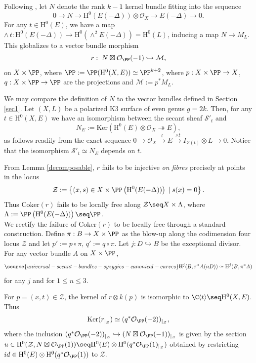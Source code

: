 Following \cite[pg.\ 1177]{V2}, let $N$ denote the rank $k-1$ kernel bundle fitting into the sequence
$$0 \to N \to \mathrm{H}^0(E(-\Delta))\otimes \mathcal{O}_X \to E(-\Delta) \to 0.$$
For any $t \in \mathrm{H}^0(E)$, we have a map $\wedge \, t :\mathrm{H}^0(E(-\Delta)) \to \mathrm{H}^0(\wedge^2 E (-\Delta))=\mathrm{H}^0(L)$, inducing a map $N \to M_L$. This globalizes to a vector bundle morphism
$$r: \; N  \boxtimes \mathcal{O}_{\PP}(-1) \hookrightarrow \mathcal{M} ,$$
on $X \times \PP$, where $\PP:=\PP(\mathrm{H}^0(X,E)) \simeq \PP^{k+2}$, where $p: X \times \PP \to X$, $q: X \times \PP \to \PP$ are the projections and $\mathcal{M}:=p^*M_L$.
\begin{remark}
\notready
We may compare the definition of $N$ to the vector bundles defined in Section \ref{sec1}. Let $(X,L)$ be a polarized K3 surface of even genus $g=2k$. Then, for any $t \in \mathrm{H}^0(X,E)$ we have an isomorphism between the secant sheaf $\mathcal{S}'_t$ and
$$N_E:= \mathrm{Ker}(\mathrm{H}^0(E) \otimes \mathcal{O}_X \twoheadrightarrow E),$$
as follows readily from the exact sequence $0 \to \mathcal{O}_X \xrightarrow{t} E \xrightarrow{\wedge t} I_{Z(t)} \otimes L \to 0$. Notice that the isomorphism $\mathcal{S}'_t \simeq N_E$ depends on $t$.
\end{remark}

From Lemma \ref{decomposable}, $r$ fails to be injective \emph{on fibres} precisely at points in the locus
$$\mathcal{Z}:=\left \{ (x,s) \in X \times \PP\left(\mathrm{H}^0(E(-\Delta))\right) \; | \; s(x)=0 \right\}.$$
Thus $\mathrm{Coker}(r)$ fails to be locally free along $\mathcal{Z} \seq X \times \Lambda$, where $\Lambda:=\PP\left(\mathrm{H}^0(E(-\Delta))\right) \seq \PP$. \\

We rectify the failure of $\mathrm{Coker}(r)$ to be locally free through a standard construction. Define $\pi: B \to X \times \PP$ as the blow-up along the codimension four locus $\mathcal{Z}$ and let $p':=p\circ \pi$, $q':=q \circ \pi$. Let $j: D \hookrightarrow B$ be the exceptional divisor. For any vector bundle $A$ on $X \times \PP$,  \begin{align} \label{mult-D-iso}
\source{universal-secant-bundles-syzygies-canonical-curves}
\mathrm{H}^j(B,\pi^*A (nD))\simeq \mathrm{H}^j(B,\pi^*A )\end{align} for any $j$ and for $1 \leq n \leq 3$.


For $p=(x,t) \in \mathcal{Z}$, the kernel of $r \otimes k(p)$ is isomorphic to $\C\langle t\rangle \seq \mathrm{H}^0(X,E)$. Thus $$\mathrm{Ker}(r_{|_{\mathcal{Z}}})\simeq ({q}^*\mathcal{O}_{\PP}(-2))_{|_{\mathcal{Z}}},$$ where the inclusion $({q}^*\mathcal{O}_{\PP}(-2))_{|_{\mathcal{Z}}} \hookrightarrow (N  \boxtimes \mathcal{O}_{\PP}(-1))_{|_{\mathcal{Z}}}$ is given by the section $u \in \mathrm{H}^0(\mathcal{Z},N  \boxtimes \mathcal{O}_{\PP}(1))\seq \mathrm{H}^0(E) \otimes \mathrm{H}^0({q}^*\mathcal{O}_{\PP}(1)_{|_{\mathcal{Z}}})$ obtained by restricting $id \in \mathrm{H}^0(E) \otimes \mathrm{H}^0({q}^*\mathcal{O}_{\PP}(1))$ to $\mathcal{Z}$.

